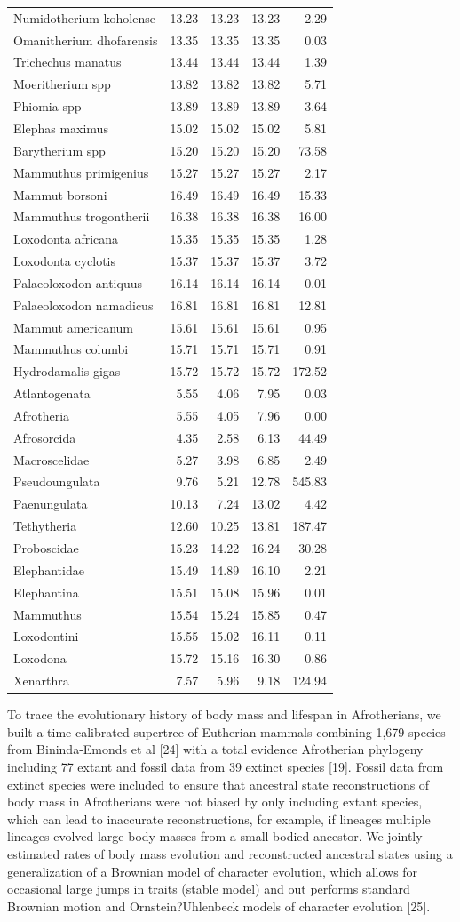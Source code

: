 \documentclass[10pt,letterpaper]{article}
\begin{document}
\begin{longtable}[]{@{}lrrrr@{}}
Numidotherium koholense & 13.23 & 13.23 & 13.23 & 2.29\tabularnewline
Omanitherium dhofarensis & 13.35 & 13.35 & 13.35 & 0.03\tabularnewline
Trichechus manatus & 13.44 & 13.44 & 13.44 & 1.39\tabularnewline
Moeritherium spp & 13.82 & 13.82 & 13.82 & 5.71\tabularnewline
Phiomia spp & 13.89 & 13.89 & 13.89 & 3.64\tabularnewline
Elephas maximus & 15.02 & 15.02 & 15.02 & 5.81\tabularnewline
Barytherium spp & 15.20 & 15.20 & 15.20 & 73.58\tabularnewline
Mammuthus primigenius & 15.27 & 15.27 & 15.27 & 2.17\tabularnewline
Mammut borsoni & 16.49 & 16.49 & 16.49 & 15.33\tabularnewline
Mammuthus trogontherii & 16.38 & 16.38 & 16.38 & 16.00\tabularnewline
Loxodonta africana & 15.35 & 15.35 & 15.35 & 1.28\tabularnewline
Loxodonta cyclotis & 15.37 & 15.37 & 15.37 & 3.72\tabularnewline
Palaeoloxodon antiquus & 16.14 & 16.14 & 16.14 & 0.01\tabularnewline
Palaeoloxodon namadicus & 16.81 & 16.81 & 16.81 & 12.81\tabularnewline
Mammut americanum & 15.61 & 15.61 & 15.61 & 0.95\tabularnewline
Mammuthus columbi & 15.71 & 15.71 & 15.71 & 0.91\tabularnewline
Hydrodamalis gigas & 15.72 & 15.72 & 15.72 & 172.52\tabularnewline
Atlantogenata & 5.55 & 4.06 & 7.95 & 0.03\tabularnewline
Afrotheria & 5.55 & 4.05 & 7.96 & 0.00\tabularnewline
Afrosorcida & 4.35 & 2.58 & 6.13 & 44.49\tabularnewline
Macroscelidae & 5.27 & 3.98 & 6.85 & 2.49\tabularnewline
Pseudoungulata & 9.76 & 5.21 & 12.78 & 545.83\tabularnewline
Paenungulata & 10.13 & 7.24 & 13.02 & 4.42\tabularnewline
Tethytheria & 12.60 & 10.25 & 13.81 & 187.47\tabularnewline
Proboscidae & 15.23 & 14.22 & 16.24 & 30.28\tabularnewline
Elephantidae & 15.49 & 14.89 & 16.10 & 2.21\tabularnewline
Elephantina & 15.51 & 15.08 & 15.96 & 0.01\tabularnewline
Mammuthus & 15.54 & 15.24 & 15.85 & 0.47\tabularnewline
Loxodontini & 15.55 & 15.02 & 16.11 & 0.11\tabularnewline
Loxodona & 15.72 & 15.16 & 16.30 & 0.86\tabularnewline
Xenarthra & 7.57 & 5.96 & 9.18 & 124.94\tabularnewline
\bottomrule
\end{longtable}

To trace the evolutionary history of body mass and lifespan in
Afrotherians, we built a time-calibrated supertree of Eutherian mammals
combining 1,679 species from Bininda-Emonds et al {[}24{]} with a total
evidence Afrotherian phylogeny including 77 extant and fossil data from
39 extinct species {[}19{]}. Fossil data from extinct species were
included to ensure that ancestral state reconstructions of body mass in
Afrotherians were not biased by only including extant species, which can
lead to inaccurate reconstructions, for example, if lineages multiple
lineages evolved large body masses from a small bodied ancestor. We
jointly estimated rates of body mass evolution and reconstructed
ancestral states using a generalization of a Brownian model of character
evolution, which allows for occasional large jumps in traits (stable
model) and out performs standard Brownian motion and Ornstein?Uhlenbeck
models of character evolution {[}25{]}.
\end{document}

